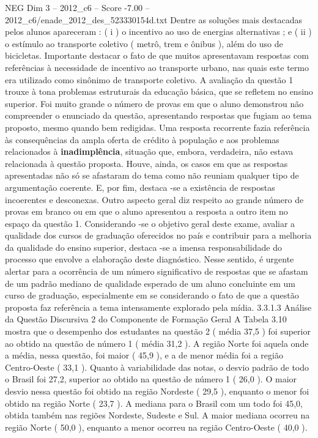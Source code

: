 \begin{textsample}{NEG Dim 3 – 2012\_c6 – Score -7.00 – 2012\_c6/enade\_2012\_des\_523330154d.txt}
Dentre as soluções mais destacadas pelos alunos apareceram : ( i ) o incentivo ao uso de energias alternativas ; e ( ii ) o estímulo ao transporte coletivo ( metrô, trem e ônibus ), além do uso de bicicletas.
Importante destacar o fato de que muitos apresentavam respostas com referências à necessidade de incentivo ao transporte urbano, nas quais este termo era utilizado como sinônimo de transporte coletivo.
A avaliação da questão 1 trouxe à tona problemas estruturais da educação básica, que se refletem no ensino superior.
Foi muito grande o número de provas em que o aluno demonstrou não compreender o enunciado da questão, apresentando respostas que fugiam ao tema proposto, mesmo quando bem redigidas.
Uma resposta recorrente fazia referência às consequências da ampla oferta de crédito à população e aos problemas relacionados à \textbf{inadimplência}, situação que, embora, verdadeira, não estava relacionada à questão proposta.
Houve, ainda, os casos em que as respostas apresentadas não só se afastaram do tema como não reuniam qualquer tipo de argumentação coerente.
E, por fim, destaca -se a existência de respostas incoerentes e desconexas.
Outro aspecto geral diz respeito ao grande número de provas em branco ou em que o aluno apresentou a resposta a outro item no espaço da questão 1.
Considerando -se o objetivo geral deste exame, avaliar a qualidade dos cursos de graduação oferecidos no país e contribuir para a melhoria da qualidade do ensino superior, destaca -se a imensa responsabilidade do processo que envolve a elaboração deste diagnóstico.
Nesse sentido, é urgente alertar para a ocorrência de um número significativo de respostas que se afastam de um padrão mediano de qualidade esperado de um aluno concluinte em um curso de graduação, especialmente em se considerando o fato de que a questão proposta faz referência a tema intensamente explorado pela mídia. 3.3.1.3 Análise da Questão Discursiva 2 do Componente de Formação Geral A Tabela 3.10 mostra que o desempenho dos estudantes na questão 2 ( média 37,5 ) foi superior ao obtido na questão de número 1 ( média 31,2 ).
A região Norte foi aquela onde a média, nessa questão, foi maior ( 45,9 ), e a de menor média foi a região Centro-Oeste ( 33,1 ).
Quanto à variabilidade das notas, o desvio padrão de todo o Brasil foi 27,2, superior ao obtido na questão de número 1 ( 26,0 ).
O maior desvio nessa questão foi obtido na região Nordeste ( 29,5 ), enquanto o menor foi obtido na região Norte ( 23,7 ).
A mediana para o Brasil com um todo foi 45,0, obtida também nas regiões Nordeste, Sudeste e Sul.
A maior mediana ocorreu na região Norte ( 50,0 ), enquanto a menor ocorreu na região Centro-Oeste ( 40,0 ).

\end{textsample}
